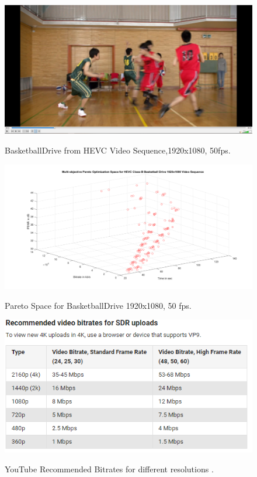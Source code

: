 \documentclass{book}
\begin{document}
\begin{figure}[!hbt]
	\centering
	{\includegraphics[width=\linewidth]{pictures/ch4/x265_1080_BasketballDrive.png}
		\label{fig:x265_BBDrive}}
	\caption{BasketballDrive from HEVC \cite{HEVCTestvideo} Video Sequence,1920x1080, 50fps.}
\end{figure}


\begin{figure}[hbt!]
	\centering
	{\includegraphics[width=0.8\linewidth]{pictures/ch4/BBDrive-ParetoSpace.png}
		\label{fig:BBDrive_PO}}
	\caption{Pareto Space for BasketballDrive 1920x1080, 50 fps.}
\end{figure}


\begin{figure}[hbt!]
	\centering
	{\includegraphics[width=\linewidth]{pictures/ch4/Youtube_recommendations.png}
		\label{fig:YouTube_Bitrates}}
	\caption{YouTube Recommended Bitrates for different resolutions \cite{YouTube}.}
\end{figure}
\end{document}
